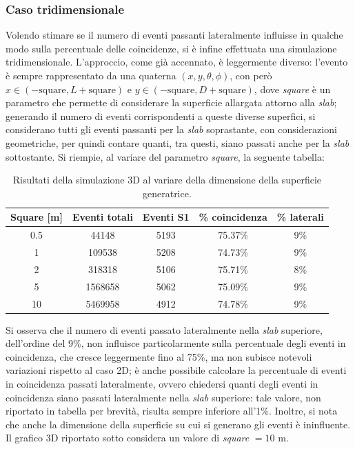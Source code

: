\subsubsection{Caso tridimensionale}
Volendo stimare se il numero di eventi passanti lateralmente influisse in qualche modo sulla percentuale delle coincidenze, si è infine effettuata una simulazione tridimensionale. L'approccio, come già accennato, è leggermente diverso: l'evento è sempre rappresentato da una quaterna $(x,y,\theta,\phi)$, con però $x\in (-\mbox{square}, L+\mbox{square})$ e $y\in (-\mbox{square}, D+\mbox{square})$, dove \emph{square} è un parametro che permette di considerare la superficie allargata attorno alla \emph{slab}; generando il numero di eventi corrispondenti a queste diverse superfici, si considerano tutti gli eventi passanti per la \emph{slab} soprastante, con considerazioni geometriche, per quindi contare quanti, tra questi, siano passati anche per la \emph{slab} sottostante.
Si riempie, al variare del parametro \emph{square}, la seguente tabella:
\begin{table}[h]
	\caption{Risultati della simulazione 3D al variare della dimensione della superficie generatrice.}
	\centering
	\begin{tabular}{ccccc}
		\toprule
		Square [m]& Eventi totali&Eventi S1& \% coincidenza &\% laterali	\\	
		\midrule
		0.5	&	44148		&	5193	&	75.37\%	& 9\%	\\
		1	&	109538	&	5208	&	74.73\%	& 9\% \\
		2	&	318318	& 	5106	&	75.71\%	& 8\% \\
		5	&	1568658	&	5062	&	75.09\%	& 9\% \\
		10	&	5469958	&	4912	&	74.78\%	& 9\%\\
		
		\bottomrule
	\end{tabular}
	\label{3D_sim}
\end{table}

Si osserva che il numero di eventi passato lateralmente nella \emph{slab} superiore, dell'ordine del 9\%, non influisce particolarmente sulla percentuale degli eventi in coincidenza, che cresce leggermente fino al 75\%, ma non subisce notevoli variazioni rispetto al caso 2D; è anche possibile calcolare la percentuale di eventi in coincidenza passati lateralmente, ovvero chiedersi quanti degli eventi in coincidenza siano passati lateralmente nella \emph{slab} superiore: tale valore, non riportato in tabella per brevità, risulta sempre inferiore all'1\%. Inoltre, si nota che anche la dimensione della superficie su cui si generano gli eventi è ininfluente. Il grafico 3D riportato sotto considera un valore di \emph{square} $=10$ m.

